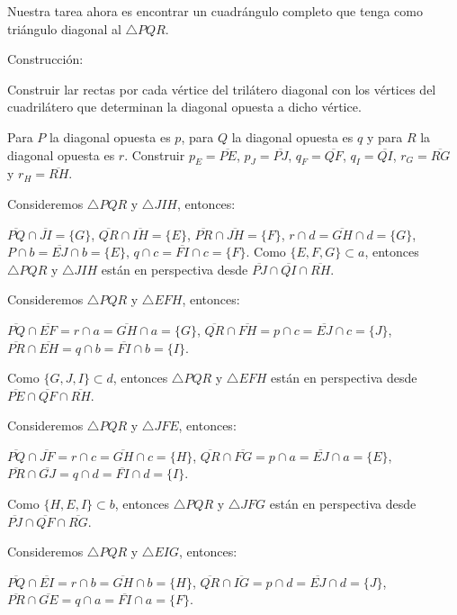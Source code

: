 Nuestra tarea ahora es encontrar un cuadrángulo completo que tenga como triángulo diagonal al $\triangle PQR$. 

Construcción:

Construir lar rectas por cada vértice del trilátero diagonal con los vértices del cuadrilátero que determinan la diagonal opuesta a dicho vértice. 

Para $P$ la diagonal opuesta es $p$, para $Q$ la diagonal opuesta es $q$ y para $R$ la diagonal opuesta es $r$. Construir $p_{E}=\overline{PE}$, $p_{J}=\overline{PJ}$, $q_{F}=\overline{QF}$, $q_{I}=\overline{QI}$, $r_{G}=\overline{RG}$ y $r_{H}=\overline{RH}$.

Consideremos $\triangle PQR$ y $\triangle JIH$, entonces:

$\overline{PQ}\cap\overline{JI}=\{G\}$,
$\overline{QR}\cap\overline{IH}=\{E\}$,
$\overline{PR}\cap\overline{JH}=\{F\}$,
$r\cap d=\overline{GH}\cap d=\{G\}$,
$P\cap b=\overline{EJ}\cap b=\{E\}$,
$q\cap c=\overline{FI}\cap c=\{F\}$. 
Como $\{E,F,G\}\subset a$, entonces $\triangle PQR$ y $\triangle JIH$ están en perspectiva desde $\overline{PJ}\cap\overline{QI}\cap\overline{RH}$.

Consideremos $\triangle PQR$ y $\triangle EFH$, entonces:

$\overline{PQ}\cap\overline{EF}=r\cap a=\overline{GH}\cap a=\{G\}$,
$\overline{QR}\cap\overline{FH}=p\cap c=\overline{EJ}\cap c=\{J\}$,
$\overline{PR}\cap\overline{EH}=q\cap b=\overline{FI}\cap b=\{I\}$.

Como $\{G,J,I\}\subset d$, entonces $\triangle PQR$ y $\triangle EFH$ están en perspectiva desde $\overline{PE}\cap\overline{QF}\cap\overline{RH}$.

Consideremos $\triangle PQR$ y $\triangle JFE$, entonces:

$\overline{PQ}\cap\overline{JF}=r\cap c=\overline{GH}\cap c=\{H\}$,
$\overline{QR}\cap\overline{FG}=p\cap a=\overline{EJ}\cap a=\{E\}$,
$\overline{PR}\cap\overline{GJ}=q\cap d=\overline{FI}\cap d=\{I\}$.

Como $\{H,E,I\}\subset b$, entonces $\triangle PQR$ y $\triangle JFG$ están en perspectiva desde $\overline{PJ}\cap\overline{QF}\cap\overline{RG}$.


Consideremos $\triangle PQR$ y $\triangle EIG$, entonces:

$\overline{PQ}\cap\overline{EI}=r\cap b=\overline{GH}\cap b=\{H\}$,
$\overline{QR}\cap\overline{IG}=p\cap d=\overline{EJ}\cap d=\{J\}$,
$\overline{PR}\cap\overline{GE}=q\cap a=\overline{FI}\cap a=\{F\}$.

